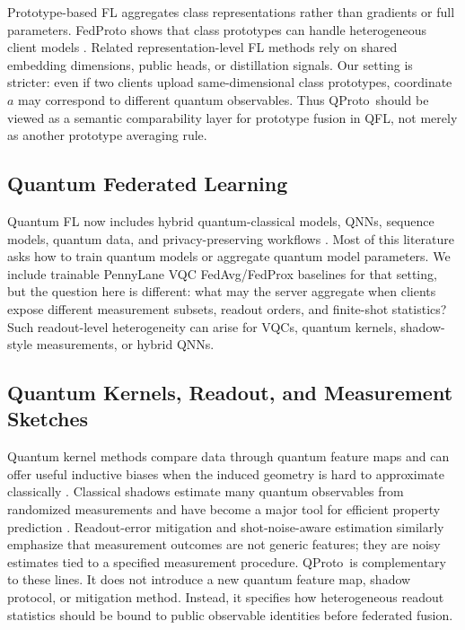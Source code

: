 \documentclass[preprint]{elsarticle}
\newcommand{\method}{QProto}
\begin{document}
Prototype-based FL aggregates class representations rather than gradients or full parameters. FedProto shows that class prototypes can handle heterogeneous client models \cite{tan2022fedproto}. Related representation-level FL methods rely on shared embedding dimensions, public heads, or distillation signals. Our setting is stricter: even if two clients upload same-dimensional class prototypes, coordinate \(a\) may correspond to different quantum observables. Thus \method\ should be viewed as a semantic comparability layer for prototype fusion in QFL, not merely as another prototype averaging rule.

\subsection{Quantum Federated Learning}

Quantum FL now includes hybrid quantum-classical models, QNNs, sequence models, quantum data, and privacy-preserving workflows \cite{chen2021fqml,xia2021quantumfed,chehimi2022qfl,chehimi2024fedqlstm,innan2024fedqnn,kumar2023privacy,ren2025towardqfl,ballester2025qflreview}. Most of this literature asks how to train quantum models or aggregate quantum model parameters. We include trainable PennyLane VQC FedAvg/FedProx baselines for that setting, but the question here is different: what may the server aggregate when clients expose different measurement subsets, readout orders, and finite-shot statistics? Such readout-level heterogeneity can arise for VQCs, quantum kernels, shadow-style measurements, or hybrid QNNs.

\subsection{Quantum Kernels, Readout, and Measurement Sketches}

Quantum kernel methods compare data through quantum feature maps and can offer useful inductive biases when the induced geometry is hard to approximate classically \cite{havlicek2019supervised,schuld2019feature,huang2021power}. Classical shadows estimate many quantum observables from randomized measurements and have become a major tool for efficient property prediction \cite{huang2020classicalshadows,hadfield2022locallybiased,bu2024pauli}. Readout-error mitigation and shot-noise-aware estimation similarly emphasize that measurement outcomes are not generic features; they are noisy estimates tied to a specified measurement procedure. \method\ is complementary to these lines. It does not introduce a new quantum feature map, shadow protocol, or mitigation method. Instead, it specifies how heterogeneous readout statistics should be bound to public observable identities before federated fusion.
\end{document}
